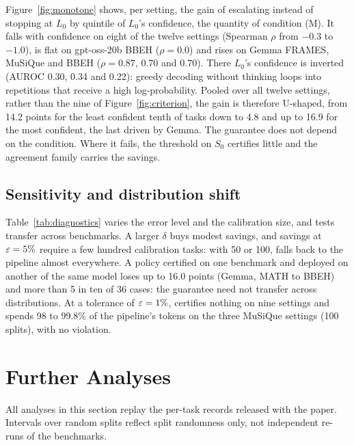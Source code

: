 


Figure~\ref{fig:monotone} shows, per setting, the gain of escalating instead of stopping at $L_0$ by
quintile of $L_0$'s confidence, the quantity of condition (M). It falls with confidence on eight of the
twelve settings (Spearman $\rho$ from $-0.3$ to $-1.0$), is flat on gpt-oss-20b BBEH ($\rho = 0.0$) and rises
on Gemma FRAMES, MuSiQue and BBEH ($\rho = 0.87$, $0.70$ and $0.70$). There $L_0$'s confidence is inverted
(AUROC 0.30, 0.34 and 0.22): greedy decoding without thinking loops into repetitions that receive a high
log-probability. Pooled over all twelve settings, rather than the nine of Figure~\ref{fig:criterion}, the gain is therefore U-shaped, from 14.2 points for the least
confident tenth of tasks down to 4.8 and up to 16.9 for the most confident, the last driven by Gemma. The guarantee does
not depend on the condition. Where it fails, the threshold on $S_0$ certifies little and the agreement
family carries the savings.

\subsection{Sensitivity and distribution shift}
\label{app:sens}



Table~\ref{tab:diagnostics} varies the error level and the calibration size, and tests transfer across
benchmarks. A larger $\delta$ buys modest savings, and savings at $\varepsilon = 5\%$ require a few hundred
calibration tasks: with 50 or 100, \climb{} falls back to the pipeline almost everywhere. A policy certified
on one benchmark and deployed on another of the same model loses up to 16.0 points (Gemma, MATH to
BBEH) and more than 5 in ten of 36 cases: the guarantee need not transfer across distributions. At a
tolerance of $\varepsilon = 1\%$, \climb{} certifies nothing on nine settings and spends 98 to 99.8\% of the
pipeline's tokens on the three MuSiQue settings (100 splits), with no violation.

\section{Further Analyses}
\label{app:review}

All analyses in this section replay the per-task records released with the paper. Intervals over random
splits reflect split randomness only, not independent re-runs of the benchmarks.

